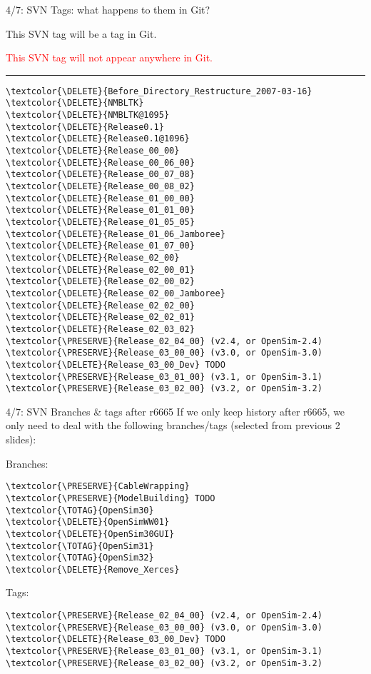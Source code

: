 \documentclass[pdf, 8pt]{beamer}
\def\NUMDECISIONS{7}
\def\DELETE{red}
\def\PRESERVE{green!60!black}
\def\TOTAG{blue}
\begin{document}
\begin{frame}[fragile]{4/\NUMDECISIONS: SVN Tags: what happens to them in Git?}

\textcolor{\PRESERVE}{This SVN tag will be a tag in Git.}

\textcolor{\DELETE}{This SVN tag will not appear anywhere in Git.}

\hrule

\begin{multicols}{2}
\begin{Verbatim}
\textcolor{\DELETE}{Before_Directory_Restructure_2007-03-16}
\textcolor{\DELETE}{NMBLTK}
\textcolor{\DELETE}{NMBLTK@1095}
\textcolor{\DELETE}{Release0.1}
\textcolor{\DELETE}{Release0.1@1096}
\textcolor{\DELETE}{Release_00_00}
\textcolor{\DELETE}{Release_00_06_00}
\textcolor{\DELETE}{Release_00_07_08}
\textcolor{\DELETE}{Release_00_08_02}
\textcolor{\DELETE}{Release_01_00_00}
\textcolor{\DELETE}{Release_01_01_00}
\textcolor{\DELETE}{Release_01_05_05}
\textcolor{\DELETE}{Release_01_06_Jamboree}
\textcolor{\DELETE}{Release_01_07_00}
\textcolor{\DELETE}{Release_02_00}
\textcolor{\DELETE}{Release_02_00_01}
\textcolor{\DELETE}{Release_02_00_02}
\textcolor{\DELETE}{Release_02_00_Jamboree}
\textcolor{\DELETE}{Release_02_02_00}
\textcolor{\DELETE}{Release_02_02_01}
\textcolor{\DELETE}{Release_02_03_02}
\textcolor{\PRESERVE}{Release_02_04_00} (v2.4, or OpenSim-2.4)
\textcolor{\PRESERVE}{Release_03_00_00} (v3.0, or OpenSim-3.0)
\textcolor{\DELETE}{Release_03_00_Dev} TODO
\textcolor{\PRESERVE}{Release_03_01_00} (v3.1, or OpenSim-3.1)
\textcolor{\PRESERVE}{Release_03_02_00} (v3.2, or OpenSim-3.2)
\end{Verbatim}
\end{multicols}
\end{frame}

\begin{frame}[fragile]{4/\NUMDECISIONS: SVN Branches \& tags after r6665}
    If we only keep history after r6665, we only need to deal with
    the following branches/tags (selected from previous 2 slides):

    \vspace{1cm}
Branches:

\begin{Verbatim}
\textcolor{\PRESERVE}{CableWrapping}
\textcolor{\PRESERVE}{ModelBuilding} TODO
\textcolor{\TOTAG}{OpenSim30}
\textcolor{\DELETE}{OpenSimWW01}
\textcolor{\DELETE}{OpenSim30GUI}
\textcolor{\TOTAG}{OpenSim31}
\textcolor{\TOTAG}{OpenSim32}
\textcolor{\DELETE}{Remove_Xerces}
\end{Verbatim}

Tags:

\begin{Verbatim}
\textcolor{\PRESERVE}{Release_02_04_00} (v2.4, or OpenSim-2.4)
\textcolor{\PRESERVE}{Release_03_00_00} (v3.0, or OpenSim-3.0)
\textcolor{\DELETE}{Release_03_00_Dev} TODO
\textcolor{\PRESERVE}{Release_03_01_00} (v3.1, or OpenSim-3.1)
\textcolor{\PRESERVE}{Release_03_02_00} (v3.2, or OpenSim-3.2)
\end{Verbatim}

\end{frame}
\end{document}
